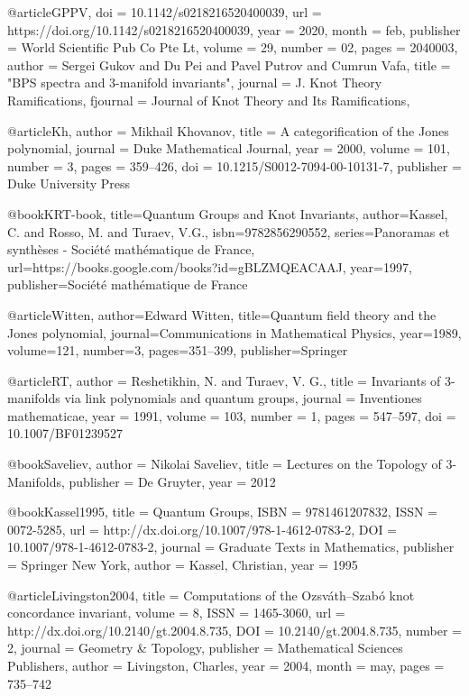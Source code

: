 @article{GPPV,
  doi = {10.1142/s0218216520400039},
  url = {https://doi.org/10.1142/s0218216520400039},
  year = {2020},
  month = feb,
  publisher = {World Scientific Pub Co Pte Lt},
  volume = {29},
  number = {02},
  pages = {2040003},
  author = {Sergei Gukov and Du Pei and Pavel Putrov and Cumrun Vafa},
  title = "{{BPS} spectra and 3-manifold invariants}",
  journal = {J. Knot Theory Ramifications},
  fjournal = {Journal of Knot Theory and Its Ramifications},
}

@article{Kh,
  author = {Mikhail Khovanov},
  title = {A categorification of the {Jones} polynomial},
  journal = {Duke Mathematical Journal},
  year = {2000},
  volume = {101},
  number = {3},
  pages = {359--426},
  doi = {10.1215/S0012-7094-00-10131-7},
  publisher = {Duke University Press}
}

@book{KRT-book,
  title={Quantum Groups and Knot Invariants},
  author={Kassel, C. and Rosso, M. and Turaev, V.G.},
  isbn={9782856290552},
  series={Panoramas et synth{\`e}ses - Soci{\'e}t{\'e} math{\'e}matique de France},
  url={https://books.google.com/books?id=gBLZMQEACAAJ},
  year={1997},
  publisher={Soci{\'e}t{\'e} math{\'e}matique de France}
}

@article{Witten,
  author={Edward Witten},
  title={Quantum field theory and the {Jones} polynomial},
  journal={Communications in Mathematical Physics},
  year={1989},
  volume={121},
  number={3},
  pages={351--399},
  publisher={Springer}
}

@article{RT,
  author = {Reshetikhin, N. and Turaev, V. G.},
  title = {Invariants of 3-manifolds via link polynomials and quantum groups},
  journal = {Inventiones mathematicae},
  year = {1991},
  volume = {103},
  number = {1},
  pages = {547--597},
  doi = {10.1007/BF01239527}
}

@book{Saveliev,
  author = {Nikolai Saveliev},
  title = {Lectures on the Topology of 3-Manifolds},
  publisher = {De Gruyter},
  year = {2012}
}

@book{Kassel1995,
  title = {Quantum Groups},
  ISBN = {9781461207832},
  ISSN = {0072-5285},
  url = {http://dx.doi.org/10.1007/978-1-4612-0783-2},
  DOI = {10.1007/978-1-4612-0783-2},
  journal = {Graduate Texts in Mathematics},
  publisher = {Springer New York},
  author = {Kassel,  Christian},
  year = {1995}
}

@article{Livingston2004,
  title = {Computations of the {Ozsv{\'a}th--Szab{\'o}} knot concordance invariant},
  volume = {8},
  ISSN = {1465-3060},
  url = {http://dx.doi.org/10.2140/gt.2004.8.735},
  DOI = {10.2140/gt.2004.8.735},
  number = {2},
  journal = {Geometry \& Topology},
  publisher = {Mathematical Sciences Publishers},
  author = {Livingston,  Charles},
  year = {2004},
  month = may,
  pages = {735--742}
}

